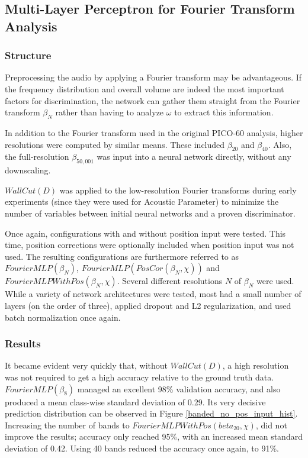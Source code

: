 \documentclass[10pt]{article}
\begin{document}
\subsection{Multi-Layer Perceptron for Fourier Transform Analysis}

\subsubsection{Structure}

Preprocessing the audio by applying a Fourier transform may be advantageous. If the frequency distribution and overall volume are indeed the most important factors for discrimination, the network can gather them straight from the Fourier transform $\beta_{N}$ rather than having to analyze $\omega$ to extract this information.

In addition to the Fourier transform used in the original PICO-60 analysis, higher resolutions were computed by similar means. These included $\beta _{20}$ and $\beta _{40}$. Also, the full-resolution $\beta _{50,001}$ was input into a neural network directly, without any downscaling.

$WallCut(D)$ was applied to the low-resolution Fourier transforms during early experiments (since they were used for Acoustic Parameter) to minimize the number of variables between initial neural networks and a proven discriminator.

Once again, configurations with and without position input were tested. This time, position corrections were optionally included when position input was not used. The resulting configurations are furthermore referred to as $FourierMLP(\beta_{N})$, $FourierMLP(PosCor(\beta_{N}, \chi))$ and $FourierMLPWithPos(\beta_{N}, \chi)$. Several different resolutions $N$ of $\beta_{N}$ were used. While a variety of network architectures were tested, most had a small number of layers (on the order of three), applied dropout and L2 regularization, and used batch normalization once again.

\subsubsection{Results}

It became evident very quickly that, without $WallCut(D)$, a high resolution was not required to get a high accuracy relative to the ground truth data. $FourierMLP(\beta_{8})$ managed an excellent 98\% validation accuracy, and also produced a mean class-wise standard deviation of 0.29. Its very decisive prediction distribution can be observed in Figure \ref{banded_no_pos_input_hist}. Increasing the number of bands to $FourierMLPWithPos(beta_{20}, \chi)$, did not improve the results; accuracy only reached 95\%, with an increased mean standard deviation of 0.42. Using 40 bands reduced the accuracy once again, to 91\%.
\end{document}
